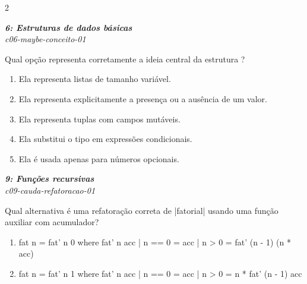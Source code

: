 \documentclass[a4paper,10pt,brazil]{article}
\begin{document}
\begin{multicols}{2}
\begin{enumerate}
\end{enumerate}

\begin{flushright}
  \footnotesize
  \textit{\textbf{6: Estruturas de dados básicas}}\\
  \textit{c06-maybe-conceito-01}\\

\end{flushright}
Qual opção representa corretamente a ideia central da estrutura ?

\begin{enumerate}
  \item Ela representa listas de tamanho variável.

  \item Ela representa explicitamente a presença ou a ausência de um valor.

  \item Ela representa tuplas com campos mutáveis.

  \item Ela substitui o tipo  em expressões condicionais.

  \item Ela é usada apenas para números opcionais.


\end{enumerate}

\begin{flushright}
  \footnotesize
  \textit{\textbf{9: Funções recursivas}}\\
  \textit{c09-cauda-refatoracao-01}\\

\end{flushright}
Qual alternativa é uma refatoração correta de \haskellinline|fatorial| usando uma função auxiliar com acumulador?

\begin{enumerate}
  \item \begin{haskellcode}
fat n = fat' n 0
  where
    fat' n acc
      | n == 0 = acc
      | n > 0  = fat' (n - 1) (n * acc)
\end{haskellcode}

  \item \begin{haskellcode}
fat n = fat' n 1
  where
    fat' n acc
      | n == 0 = acc
      | n > 0  = n * fat' (n - 1) acc
\end{haskellcode}


\end{enumerate}
\end{multicols}
\end{document}
